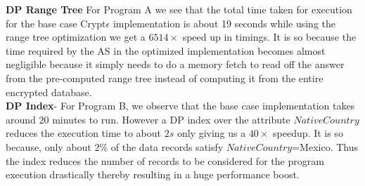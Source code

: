 \begin{table}
\caption{Execution Time Analysis for Crypt$\epsilon$ Programs}
\centering
{}
\label{c}
\end{table}
\textbf{DP Range Tree}
 For Program A we see that the total time taken for execution for the base case Crypt$\epsilon$ implementation is about 19 seconds while using the range tree optimization we get a $6514\times$ speed up in timings. It is so because the time required by the \textsf{AS} in the optimized implementation becomes almost negligible because it simply needs to do a memory fetch to read off the answer from the pre-computed range tree instead of computing it from the entire encrypted database. %
\\\textbf{DP Index}- For Program B, we observe that the base case implementation takes around $20$ minutes to run. However  a DP index over the attribute $NativeCountry$  reduces the execution time to about $2s$ only  giving us a $40\times $ speedup. It is so because, only about 2\% of the data records satisfy $NativeCountry$=Mexico. Thus the index reduces the number of records to be considered for the program execution drastically thereby resulting in a huge performance boost. %
